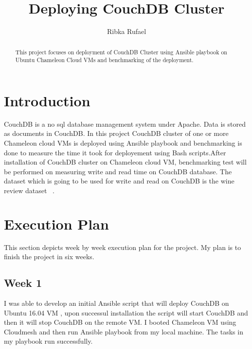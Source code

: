 \title{Deploying CouchDB Cluster}


\author{Ribka Rufael}
\orcid{}



\renewcommand{\shortauthors}{R. Rufael}


\begin{abstract}
  This project focuses on deployment of CouchDB Cluster using Ansible
  playbook on Ubuntu Chameleon Cloud VMs and benchmarking of the
  deployment.
\end{abstract}



\maketitle

\section{Introduction}

CouchDB \cite{www-Couchdb} is a no sql database management system
under Apache. Data is stored as documents in CouchDB. In this project
CouchDB cluster of one or more Chameleon cloud VMs is deployed using
Ansible playbook and benchmarking is done to measure the time it took
for deployement using Bash scripts.After installation of CouchDB
cluster on Chameleon cloud VM, benchmarking test will be performed on
measuring write and read time on CouchDB database. The dataset which
is going to be used for write and read on CouchDB is the wine review
dataset ~\cite{www-WineReview}.

\section{Execution Plan}

This section depicts week by week execution plan for the project. My
plan is to finish the project in six weeks.

\subsection{Week 1}

I was able to develop an initial Ansible script that will deploy
CouchDB on Ubuntu 16.04 VM , upon successul installation the script
will start CouchDB and then it will stop CouchDB on the remote VM. I
booted Chameleon VM using Cloudmesh and then run Ansible playbook from
my local machine. The tasks in my playbook run successfully.

